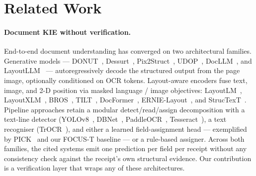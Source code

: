 
\section{Related Work}
\label{sec:related}

\paragraph{Document KIE without verification.}
End-to-end document understanding has converged on two architectural
families.  Generative models — DONUT~\cite{kim2022donut},
Dessurt~\cite{davis2022dessurt}, Pix2Struct~\cite{lee2023pix2struct},
UDOP~\cite{tang2023unifying}, DocLLM~\cite{wang2024docllm}, and
LayoutLLM~\cite{luo2024layoutllm} — autoregressively decode the
structured output from the page image, optionally conditioned on OCR
tokens.  Layout-aware encoders fuse text, image, and 2-D position via
masked language / image objectives:
LayoutLM~\cite{xu2020layoutlm,xu2021layoutlmv2,huang2022layoutlmv3},
LayoutXLM~\cite{xu2021layoutxlm}, BROS~\cite{hong2022bros},
TILT~\cite{powalski2021tilt}, DocFormer~\cite{appalaraju2021docformer},
ERNIE-Layout~\cite{peng2022ernielayout}, and
StrucTexT~\cite{li2021structext}.  Pipeline approaches retain a
modular detect/read/assign decomposition with a text-line detector
(YOLOv8~\cite{jocher2023yolov8}, DBNet~\cite{liao2020dbnet},
PaddleOCR~\cite{paddleocr}, Tesseract~\cite{smith2007tesseract}),
a text recogniser (TrOCR~\cite{li2023trocr}), and either a learned
field-assignment head — exemplified by PICK~\cite{yu2020pick} and our
FOCUS-T baseline — or a rule-based assigner.  Across both families,
the cited systems emit one prediction per field per receipt without
any consistency check against the receipt's own structural
evidence.  Our contribution is a verification layer that wraps any
of these architectures.

